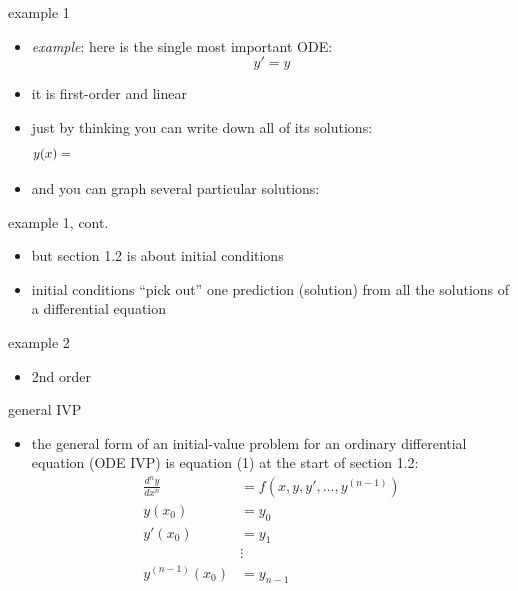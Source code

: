 \documentclass{beamer}
\begin{document}
\begin{frame}{example 1}

\begin{itemize}
\item \emph{example}: here is the single most important ODE:
    $$y' = y$$
\item it is first-order and linear
\item just by thinking you can write down all of its solutions:
    $$y(x) = \hspace{5.0in}$$
\item and you can graph several particular solutions:

\end{itemize}

\vfill
\end{frame}

\begin{frame}{example 1, cont.}

\begin{itemize}
\item but section 1.2 is about initial conditions
\item initial conditions ``pick out'' one prediction (solution) from all the solutions of a differential equation
\end{itemize}

\vfill
\end{frame}

\begin{frame}{example 2}

\begin{itemize}
\item 2nd order
\end{itemize}
\end{frame}

\begin{frame}{general IVP}

\begin{itemize}
\item the general form of an initial-value problem for an ordinary differential equation (ODE IVP) is equation (1) at the start of section 1.2:
\begin{align*}
\frac{d^n y}{dx^n} &= f(x,y,y',\dots,y^{(n-1)}) \\
y(x_0) &= y_0 \\
y'(x_0) &= y_1 \\
   &\vdots \\
y^{(n-1)}(x_0) &= y_{n-1}
\end{align*}
\end{itemize}
\end{frame}
\end{document}
